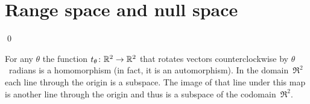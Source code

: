 \documentclass[10pt,t,serif,professionalfont]{beamer}
\begin{document}
\section{Range space and null space}
\begin{frame}
\lm[le:RangeIsSubSp]

\pause
\pf
{}
\qed

\pause
\ex
For any $\theta$ the function $\mbox{$t_{\theta}\colon \mathbb{R}^2\to \mathbb{R}^2$}$ that rotates 
vectors counterclockwise by $\theta$~radians is a homomorphism
(in fact, it is an automorphism).
In the domain~$\Re^2$ each line through the origin is a subspace.
The image of that line under this map is another line through the origin 
and thus is a subspace of the codomain~$\Re^2$. 
\end{frame}
\end{document}
